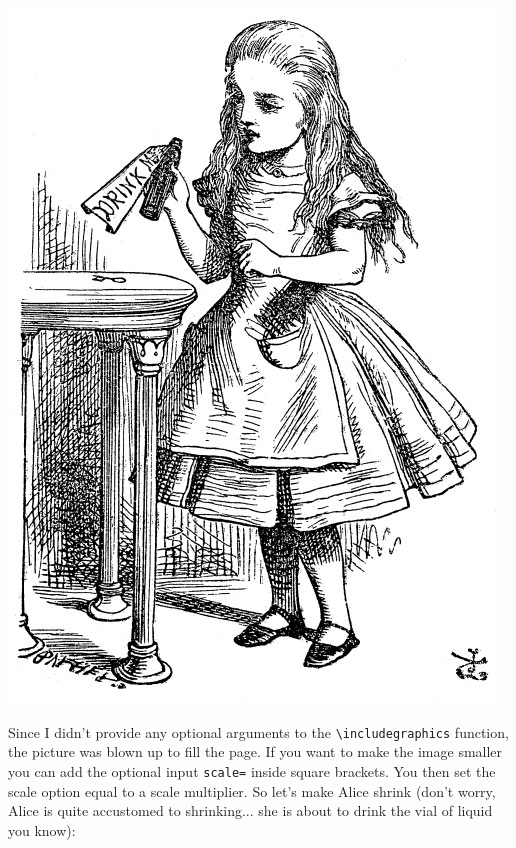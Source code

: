 \documentclass{article}
\newcommand{\nid}{\noindent} %
\begin{document}
\includegraphics{alice}

\nid Since I didn't provide any optional arguments to the \verb|\includegraphics| function, the picture was blown up to fill the page.  If you want to make the image smaller you can add the optional input \verb|scale=| inside square brackets.  You then set the scale option equal to a scale multiplier.  So let's make Alice shrink (don't worry, Alice is quite accustomed to shrinking... she is about to drink the vial of liquid you know):\\
\end{document}
